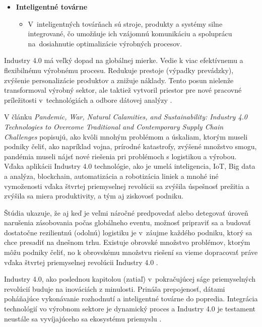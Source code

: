 \begin{itemize}
\begin{itemize}
\begin{itemize}
        \end{itemize}
     \item \textbf{Inteligentné továrne}
        \begin{itemize}
            \item V~inteligentných továrňach sú stroje, produkty a systémy silne integrované, čo umožňuje ich vzájomnú komunikáciu a spoluprácu na~dosiahnutie optimalizácie výrobných procesov. %
        \end{itemize}
   \end{itemize}
\end{itemize}

Industry 4.0 má veľký dopad na globálnej mierke. Vedie k viac efektívnemu a flexibilnému výrobnému procesu. Redukuje prestoje (výpadky prevádzky), zvýšenie personalizácie produktov a znižuje náklady. Tento posun nielenže transformoval výrobný sektor, ale taktiež vytvoril priestor pre nové pracovné príležitosti v~technológiách a odbore dátovej analýzy \cite{rajan2023industry40}. 

V článku \textit{Pandemic, War, Natural Calamities, and Sustainability: Industry 4.0 Technologies to Overcome Traditional and Contemporary Supply Chain Challenges} popisujú, ako kvôli mnohým problémom a úskaliam, ktorým museli podniky čeliť, ako napríklad vojna, prírodné katastrofy, zvýšené množstvo smogu, pandémia museli nájsť nové riešenia pri problémoch s logistikou a výrobou. Vďaka aplikácii Industry 4.0 technológie, ako je umelá inteligencia, IoT, Big data a analýza, blockchain, automatizácia a robotizácia liniek a mnohé iné vymoženosti vďaka štvrtej priemyselnej revolúcii sa zvýšila úspešnosť prežitia a zvýšila sa miera produktivity, a tým aj ziskovosť podniku. %

Štúdia ukazuje, že aj keď je veľmi náročné predpovedať alebo detegovať úroveň narušenia zásobovania počas globálneho eventu,  možnosť pripraviť sa a budovať dostatočne rezilientnú (odolnú) logistiku je v~záujme každého podniku, ktorý sa chce presadiť na dnešnom trhu. Existuje obrovské množstvo problémov, ktorým môžu podniky čeliť, no k obrovskému množstvu riešení sa vieme dopracovať práve vďaka štvrtej priemyselnej revolúcii Industry 4.0 \cite{rajasanthi2022industry40}.

Industry 4.0, ako poslednou kapitolou (zatiaľ) v~pokračujúcej ságe priemyselných revolúcií buduje na inováciách z minulosti. Prináša prepojenosť, dátami poháňajúce vykonávanie rozhodnutí a inteligentné továrne do popredia. Integrácia technológií vo výrobnom sektore je dynamický proces a Industry 4.0 je testament neustále sa vyvíjajúceho sa ekosystému priemyslu \cite{rajan2023industry40}. 

